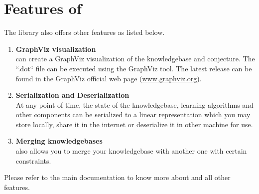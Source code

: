 \section{Features of \libalf}
The library also offers other features as listed below.
\begin{enumerate}
 \item \textbf{GraphViz visualization} \\
       \libalf can create a GraphViz visualization of the knowledgebase and conjecture. The ``.dot`` file can be executed using the GraphViz tool. The latest release can be found in the GraphViz official web page (\url{www.graphviz.org}).
 \item \textbf{Serialization and Deserialization} \\
	At any point of time, the state of the knowledgebase, learning algorithms and other components can be serialized to a linear representation which you may store locally, share it in the internet or deserialize it in other machine for use.
 \item \textbf{Merging knowledgebases} \\
	\libalf also allows you to merge your knowledgebase with another one with certain constraints.
\end{enumerate}
Please refer to the main documentation to know more about \libalf and all other features.

